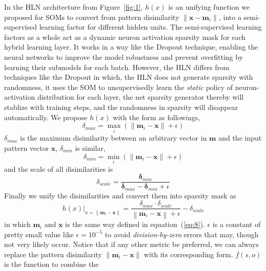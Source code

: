 \documentclass[3p,times,procedia]{elsarticle}
\begin{document}
In the HLN architecture from 
Figure~\ref{fig:1},
$h(x)$ is an unifying function we proposed for 
SOMs to convert from pattern disimilarity
$\|\mathbf{x}-\mathbf{m}_i\|$, into
a semi-supervised learning factor for
different hidden units. The semi-supervised
learning factors as a whole act as a 
dynamic neuron activation sparsity mask for 
each hybrid learning layer.
It works in a way like the Dropout 
technique\cite{srivastava2014dropout}, 
enabling the neural networks 
to improve the model robustness and prevent
overfitting by learning their submodels for 
each batch. However, the HLN differs from 
techniques like the Dropout in which, 
the HLN does not generate sparsity with 
randomness, it uses the SOM
to unsupervisedly learn the \emph{static}
policy of neuron-activation distribution for
each layer, the net sparsity generator thereby
will stablize with training steps, and the
randomness in sparsity will disappear 
automatically.
We propose $h(x)$ with the form as followings,
\begin{equation}
	\delta_{max} = \max_i\left(
	\|\mathbf{m}_i-\mathbf{x}\|+\epsilon
	\right)
	\label{eq:10}
\end{equation}
$\delta_{max}$ is the maximum disimilarity
between an arbitrary vector in $\mathbf{m}$
and the input pattern vector $\mathbf{x}$,
$\delta_{min}$ is similar,
\begin{equation}
	\delta_{min} = \min_i\left(
	\|\mathbf{m}_i-\mathbf{x}\|+\epsilon
	\right)
	\label{eq:11}
\end{equation}
and the scale of all disimilarities is
\begin{equation}
	\delta_{scale} = 
	\frac{\mathbf{\delta}_{min}}
	{\mathbf{\delta}_{max}-
	\mathbf{\delta}_{min} + \epsilon}
	\label{eq:12}
\end{equation}
Finally we unify the disimilarities and convert
them into sparsity mask as
\begin{equation}
	h(x)|_{x=\|\mathbf{m}_i-\mathbf{x}\|}=
	\frac{\delta_{max}\cdot\delta_{scale}}
	{\left\|\mathbf{m}_i-\mathbf{x}\right\|
	+\epsilon}-\delta_{scale}
	\label{eq:13}
\end{equation}
in which $\mathbf{m}_i$ and $\mathbf{x}$ is the
same way defined in equation~(\ref{eq:8}).
$\epsilon$ is a constant of pretty small value
like $\epsilon=10^{-5}$ to avoid 
\emph{division-by-zero} errors that may, 
though not very likely occur. Notice that
if any other metric be preferred, we can
always replace the pattern disimilarity
$\|\mathbf{m}_i-\mathbf{x}\|$ with its
corresponding form.
$f(s,o)$ is the function to combine the 
\end{document}
